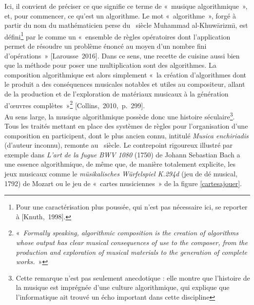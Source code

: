 \documentclass[a4paper,12pt]{article}
\newcommand{\guill}[1]{«~#1~»}
\newcommand{\cicite}[1]{{\footnotesize[#1]}}
\begin{document}
Ici, il convient de préciser ce que signifie ce terme de \guill{musique algorithmique}, et, pour commencer, ce qu'est un algorithme. Le mot \guill{algorithme}, forgé à partir du nom du mathématicien perse du \IXe~siècle Muhammad al-Khuw\=arizm\=\i, est défini\footnote{Pour une caractérisation plus poussée, qui n'est pas nécessaire ici, se reporter à \cicite{Knuth,~1998}.} par le comme un \guill{ensemble de règles opératoires dont l'application permet de résoudre un problème énoncé au moyen d'un nombre fini d'opérations} \cicite{Larousse~2016}. Dans ce sens, une recette de cuisine aussi bien que la méthode pour poser une multiplication sont des algorithmes. La composition algorithmique est alors simplement \guill{la création d'algorithmes dont le produit a des conséquences musicales notables et utiles au compositeur, allant de la production et de l'exploration de matériaux musicaux à la génération d'œuvres complètes}\footnote{\guill{\emph{Formally speaking, algorithmic composition is the creation of algorithms whose output has clear musical consequences of use to the composer, from the production and exploration of musical materials to the generation of complete works.}}} \cicite{Collins,~2010,~p.~299}. \\
Au sens large, la musique algorithmique possède donc une histoire séculaire\footnote{Cette remarque n'est pas seulement anecdotique : elle montre que l'histoire de la musique est imprégnée d'une culture algorithmique, qui explique que l'informatique ait trouvé un écho important dans cette discipline}. Tous les traités mettant en place des systèmes de règles pour l'organisation d'une composition en participent, dont le plus ancien connu, intitulé \emph{Musica enchiriadis} (d'auteur inconnu), remonte au \IXe~siècle. Le contrepoint rigoureux illustré par exemple dans \emph{L'art de la fugue BWV 1080} (1750) de Johann Sebastian Bach a une essence algorithmique, de même que, de manière totalement explicite, les jeux musicaux comme le \emph{müsikalisches Würfelspiel K.294d} (jeu de dé musical, 1792) de Mozart ou le jeu de \guill{cartes musiciennes} de la figure \ref{cartesajouer}. \\
\end{document}

